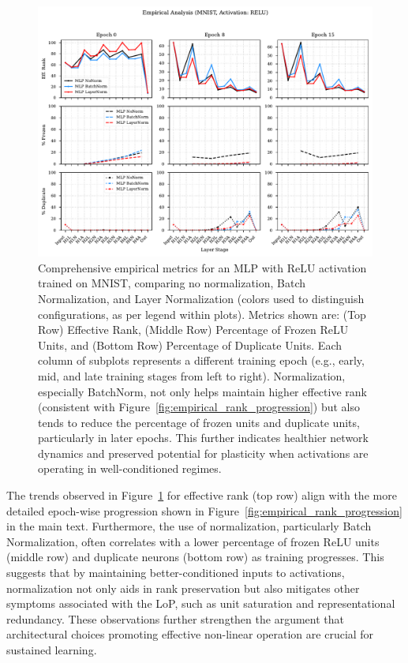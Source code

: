 \documentclass{article}
\begin{document}
\begin{figure}[h!]
    \centering
    \includegraphics[width=\textwidth]{figures/empirical_all_metrics_ReLU_MNIST.pdf}
    \caption{Comprehensive empirical metrics for an MLP with ReLU activation trained on MNIST, comparing no normalization, Batch Normalization, and Layer Normalization (colors used to distinguish configurations, as per legend within plots). Metrics shown are: (Top Row) Effective Rank, (Middle Row) Percentage of Frozen ReLU Units, and (Bottom Row) Percentage of Duplicate Units. Each column of subplots represents a different training epoch (e.g., early, mid, and late training stages from left to right). Normalization, especially BatchNorm, not only helps maintain higher effective rank (consistent with Figure~\ref{fig:empirical_rank_progression}) but also tends to reduce the percentage of frozen units and duplicate units, particularly in later epochs. This further indicates healthier network dynamics and preserved potential for plasticity when activations are operating in well-conditioned regimes.}
    \label{fig:empirical_all_metrics}
\end{figure}

The trends observed in Figure~\ref{fig:empirical_all_metrics} for effective rank (top row) align with the more detailed epoch-wise progression shown in Figure~\ref{fig:empirical_rank_progression} in the main text. Furthermore, the use of normalization, particularly Batch Normalization, often correlates with a lower percentage of frozen ReLU units (middle row) and duplicate neurons (bottom row) as training progresses. This suggests that by maintaining better-conditioned inputs to activations, normalization not only aids in rank preservation but also mitigates other symptoms associated with the LoP, such as unit saturation and representational redundancy. These observations further strengthen the argument that architectural choices promoting effective non-linear operation are crucial for sustained learning.
\end{document}
